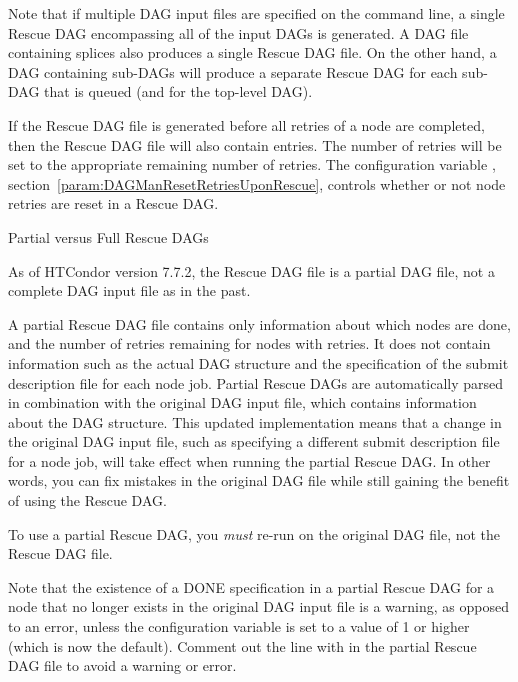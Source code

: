 Note that if multiple DAG input files are specified on the
 command line,
a single Rescue DAG encompassing all of the input DAGs is generated.
A DAG file containing splices also produces a single Rescue DAG file.
On the other hand, a DAG containing sub-DAGs will produce a
separate Rescue DAG for each sub-DAG that is queued (and for the
top-level DAG).

If the Rescue DAG file is generated before all retries
of a node are completed, 
then the Rescue DAG file will also contain  entries.
The number of retries will be set to the appropriate remaining
number of retries.
The configuration variable , 
section~\ref{param:DAGManResetRetriesUponRescue},
controls whether or not node retries are reset in a Rescue DAG.


\label{dagman:partial_full_rescue_dag}
\begin{description}
\item[Partial versus Full Rescue DAGs]
\end{description}

As of HTCondor version 7.7.2, the Rescue DAG file is a partial DAG file,
not a complete DAG input file as in the past.

A partial Rescue DAG file contains only information about which nodes are done,
and the number of retries remaining for nodes with retries.  
It does not contain information such as the actual
DAG structure and the specification of the submit description file 
for each node job.  
Partial Rescue DAGs are automatically parsed in combination with
the original DAG input file, 
which contains information about the DAG structure.  
This updated implementation means that a change in the original DAG input file,
such as specifying a different submit description file for a node job,
will take effect when running the partial Rescue DAG.
In other words, you can fix mistakes in the original DAG file while
still gaining the benefit of using the Rescue DAG.

To use a partial Rescue DAG, you \emph{must} re-run 
on the original DAG file, not the Rescue DAG file.

Note that the existence of a DONE specification in a partial Rescue DAG for
a node that no longer exists in the original DAG input file
is a warning, as opposed to an error, 
unless the  configuration
variable is set to a value of 1 or higher (which is now the default).  
Comment out the line with  in the partial Rescue DAG file
to avoid a warning or error.

